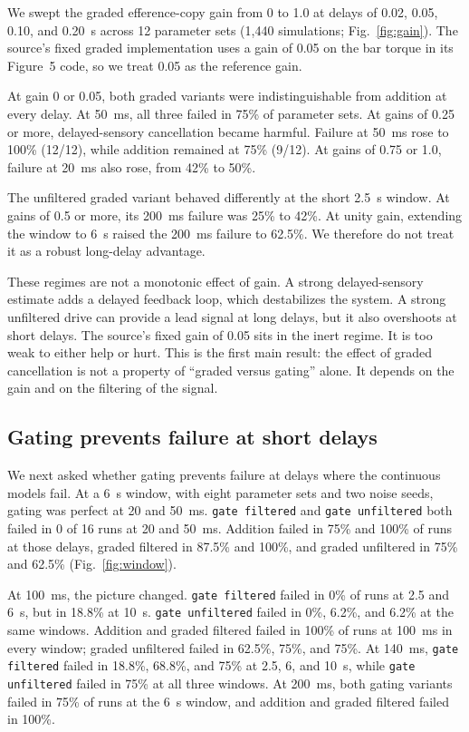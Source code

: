 \documentclass[pdflatex,sn-nature]{sn-jnl}
\begin{document}
We swept the graded efference-copy gain from 0 to 1.0 at delays of 0.02, 0.05, 0.10, and 0.20~s across 12 parameter sets (1{,}440 simulations; Fig.~\ref{fig:gain}). The source's fixed graded implementation uses a gain of 0.05 on the bar torque in its Figure~5 code, so we treat 0.05 as the reference gain.

At gain 0 or 0.05, both graded variants were indistinguishable from addition at every delay. At 50~ms, all three failed in 75\% of parameter sets. At gains of 0.25 or more, delayed-sensory cancellation became harmful. Failure at 50~ms rose to 100\% (12/12), while addition remained at 75\% (9/12). At gains of 0.75 or 1.0, failure at 20~ms also rose, from 42\% to 50\%.

The unfiltered graded variant behaved differently at the short 2.5~s window. At gains of 0.5 or more, its 200~ms failure was 25\% to 42\%. At unity gain, extending the window to 6~s raised the 200~ms failure to 62.5\%. We therefore do not treat it as a robust long-delay advantage.

These regimes are not a monotonic effect of gain. A strong delayed-sensory estimate adds a delayed feedback loop, which destabilizes the system. A strong unfiltered drive can provide a lead signal at long delays, but it also overshoots at short delays. The source's fixed gain of 0.05 sits in the inert regime. It is too weak to either help or hurt. This is the first main result: the effect of graded cancellation is not a property of ``graded versus gating'' alone. It depends on the gain and on the filtering of the signal.

\subsection{Gating prevents failure at short delays}

We next asked whether gating prevents failure at delays where the continuous models fail. At a 6~s window, with eight parameter sets and two noise seeds, gating was perfect at 20 and 50~ms. \texttt{gate filtered} and \texttt{gate unfiltered} both failed in 0 of 16 runs at 20 and 50~ms. Addition failed in 75\% and 100\% of runs at those delays, graded filtered in 87.5\% and 100\%, and graded unfiltered in 75\% and 62.5\% (Fig.~\ref{fig:window}).

At 100~ms, the picture changed. \texttt{gate filtered} failed in 0\% of runs at 2.5 and 6~s, but in 18.8\% at 10~s. \texttt{gate unfiltered} failed in 0\%, 6.2\%, and 6.2\% at the same windows. Addition and graded filtered failed in 100\% of runs at 100~ms in every window; graded unfiltered failed in 62.5\%, 75\%, and 75\%. At 140~ms, \texttt{gate filtered} failed in 18.8\%, 68.8\%, and 75\% at 2.5, 6, and 10~s, while \texttt{gate unfiltered} failed in 75\% at all three windows. At 200~ms, both gating variants failed in 75\% of runs at the 6~s window, and addition and graded filtered failed in 100\%.
\end{document}
